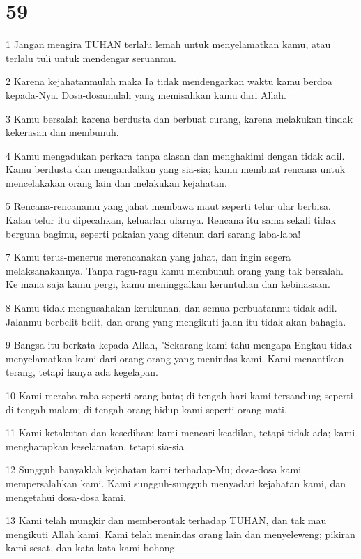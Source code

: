 \chapter{59}

\par 1 Jangan mengira TUHAN terlalu lemah untuk menyelamatkan kamu, atau terlalu tuli untuk mendengar seruanmu.
\par 2 Karena kejahatanmulah maka Ia tidak mendengarkan waktu kamu berdoa kepada-Nya. Dosa-dosamulah yang memisahkan kamu dari Allah.
\par 3 Kamu bersalah karena berdusta dan berbuat curang, karena melakukan tindak kekerasan dan membunuh.
\par 4 Kamu mengadukan perkara tanpa alasan dan menghakimi dengan tidak adil. Kamu berdusta dan mengandalkan yang sia-sia; kamu membuat rencana untuk mencelakakan orang lain dan melakukan kejahatan.
\par 5 Rencana-rencanamu yang jahat membawa maut seperti telur ular berbisa. Kalau telur itu dipecahkan, keluarlah ularnya. Rencana itu sama sekali tidak berguna bagimu, seperti pakaian yang ditenun dari sarang laba-laba!
\par 7 Kamu terus-menerus merencanakan yang jahat, dan ingin segera melaksanakannya. Tanpa ragu-ragu kamu membunuh orang yang tak bersalah. Ke mana saja kamu pergi, kamu meninggalkan keruntuhan dan kebinasaan.
\par 8 Kamu tidak mengusahakan kerukunan, dan semua perbuatanmu tidak adil. Jalanmu berbelit-belit, dan orang yang mengikuti jalan itu tidak akan bahagia.
\par 9 Bangsa itu berkata kepada Allah, "Sekarang kami tahu mengapa Engkau tidak menyelamatkan kami dari orang-orang yang menindas kami. Kami menantikan terang, tetapi hanya ada kegelapan.
\par 10 Kami meraba-raba seperti orang buta; di tengah hari kami tersandung seperti di tengah malam; di tengah orang hidup kami seperti orang mati.
\par 11 Kami ketakutan dan kesedihan; kami mencari keadilan, tetapi tidak ada; kami mengharapkan keselamatan, tetapi sia-sia.
\par 12 Sungguh banyaklah kejahatan kami terhadap-Mu; dosa-dosa kami mempersalahkan kami. Kami sungguh-sungguh menyadari kejahatan kami, dan mengetahui dosa-dosa kami.
\par 13 Kami telah mungkir dan memberontak terhadap TUHAN, dan tak mau mengikuti Allah kami. Kami telah menindas orang lain dan menyeleweng; pikiran kami sesat, dan kata-kata kami bohong.
